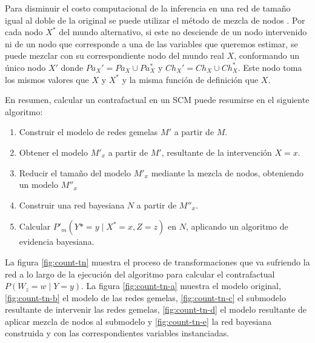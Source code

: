 Para disminuir el costo computacional de la inferencia en una red de tamaño igual al doble de la original se puede utilizar el método de mezcla de nodos \cite{shpitser2012counterfactuals}. Por cada nodo $X^{\ast}$ del mundo alternativo, si este no desciende de un nodo intervenido ni de un nodo que corresponde a una de las variables que queremos estimar, se puede mezclar con su correspondiente nodo del mundo real $X$, conformando un único nodo $X'$ donde $Pa_X' = Pa_X \cup Pa_X^{\ast}$ y $Ch_X' = Ch_X \cup Ch_X^{\ast}$. Este nodo toma los mismos valores que $X$ y $X^{\ast}$ y la misma función de definición que $X$. 

En resumen, calcular un contrafactual en un SCM puede resumirse en el siguiente algoritmo:

\begin{enumerate}
	\item Construir el modelo de redes gemelas $M'$ a partir de $M$.
	\item Obtener el modelo $M'_x$ a partir de $M'$, resultante de la intervención $X=x$.
	\item Reducir el tamaño del modelo $M'_x$ mediante la mezcla de nodos, obteniendo un modelo $M''_x$
	\item Construir una red bayesiana $N$ a partir de $M''_x$.
	\item Calcular $P'_m(Y*=y \mid X^{\ast}=x, Z=z)$ en $N$, aplicando un algoritmo de evidencia bayesiana.
\end{enumerate}

La figura \ref{fig:count-tn} muestra el proceso de transformaciones que va sufriendo la red a lo largo de la ejecución del algoritmo para calcular el contrafactual $P(W_z=w\mid Y=y)$. La figura \ref{fig:count-tn-a} muestra el modelo original, \ref{fig:count-tn-b} el modelo de las redes gemelas, \ref{fig:count-tn-c} el submodelo resultante de intervenir las redes gemelas, \ref{fig:count-tn-d} el modelo resultante de aplicar mezcla de nodos al submodelo y \ref{fig:count-tn-e} la red bayesiana construida y con las correspondientes variables instanciadas. 


